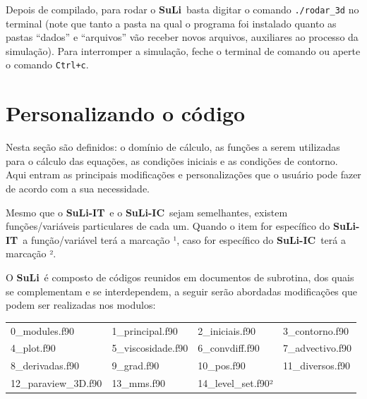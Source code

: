 \documentclass[12pt, a4paper]{article}
\newcommand{\SL}{{\bf SuLi}}
\newcommand{\SLIT}{{\bf SuLi-IT}}
\newcommand{\SLIC}{{\bf SuLi-IC}}
\begin{document}
Depois de compilado, para rodar o \SL\ basta digitar o comando \verb!./rodar_3d! no terminal (note que tanto a pasta na qual o programa foi instalado quanto as pastas ``dados'' e ``arquivos'' vão receber novos arquivos, auxiliares ao processo da simulação). Para interromper a simulação, feche o terminal de comando ou aperte o comando \verb!Ctrl+c!.


\newpage

\section{Personalizando o código}	\label{utilizando_o_codigo}

Nesta seção são definidos: o domínio de cálculo, as funções a serem utilizadas para o cálculo das equações, as condições iniciais e as condições de contorno. Aqui entram as principais modificações e personalizações que o usuário pode fazer de acordo com a sua necessidade.

Mesmo que o \SLIT\ e o \SLIC\ sejam semelhantes, existem funções/variáveis particulares de cada um. Quando o item for específico do \SLIT\ a função/variável terá a marcação ¹, caso for específico do \SLIC\ terá a marcação ².

O \SL\ é composto de códigos reunidos em documentos de subrotina, dos quais se complementam e se interdependem, a seguir serão abordadas modificações que podem ser realizadas nos modulos:

\begin{table}[htb]
	\begin{center}
		\begin{tabular}{llll}
		0\_modules.f90 & 1\_principal.f90 & 2\_iniciais.f90 & 3\_contorno.f90 \\
		4\_plot.f90  & 5\_viscosidade.f90 & 6\_convdiff.f90 & 7\_advectivo.f90 \\
		8\_derivadas.f90 & 9\_grad.f90 & 10\_pos.f90 & 11\_diversos.f90 \\
		12\_paraview\_3D.f90 & 13\_mms.f90 & 14\_level\_set.f90² & \\
		\end{tabular}		
	\end{center}
\end{table}
\end{document}
